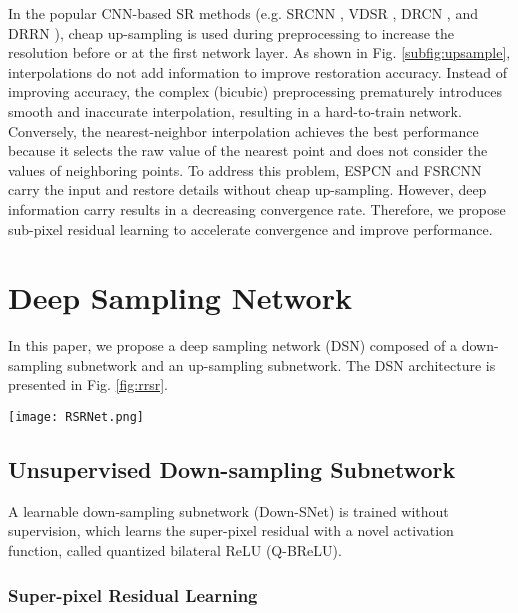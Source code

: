 \documentclass[runningheads]{llncs}
\begin{document}
In the popular CNN-based SR methods (e.g. SRCNN \cite{srcnn}, VDSR \cite{vdsr}, DRCN \cite{drcn}, and DRRN \cite{drrn}), cheap up-sampling is used during preprocessing to increase the resolution before or at the first network layer. As shown in Fig. \ref{subfig:upsample}, interpolations do not add information to improve restoration accuracy. Instead of improving accuracy, the complex (bicubic) preprocessing prematurely introduces smooth and inaccurate interpolation, resulting in a hard-to-train network. Conversely, the nearest-neighbor interpolation achieves the best performance because it selects the raw value of the nearest point and does not consider the values of neighboring points. To address this problem, ESPCN \cite{espcn} and FSRCNN \cite{fsrcnn} carry the input and restore details without cheap up-sampling. However, deep information carry results in a decreasing convergence rate. Therefore, we propose sub-pixel residual learning to accelerate convergence and improve performance.

\section{Deep Sampling Network}
In this paper, we propose a deep sampling network (DSN) composed of a down-sampling subnetwork and an up-sampling subnetwork. The DSN architecture is presented in Fig. \ref{fig:rrsr}.
\begin{figure*}[th]
\begin{center}
   \texttt{[image: RSRNet.png]}
\end{center}
   \caption{The deep sampling network. (1) The down-sampling subnetwork (Down-SNet) is trained in an unsupervised manner with super-pixel residual learning and the Q-BReLU function. (2) The up-sampling subnetwork (Up-SNet) learns the dense pixel representation by sub-pixel residual learning.}
\label{fig:rrsr}
\end{figure*}

\subsection{Unsupervised Down-sampling Subnetwork}

A learnable down-sampling subnetwork (Down-SNet) is trained without supervision, which learns the super-pixel residual with a novel activation function, called quantized bilateral ReLU (Q-BReLU).

\subsubsection{Super-pixel Residual Learning}
\end{document}
